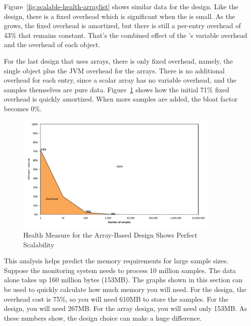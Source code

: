 Figure~\ref{fig:scalable-health-arraylist} shows similar data for the
 design. Like the  design, there is a fixed
overhead which is significant when the  is small. As the
 grows, the fixed overhead is amortized, but there is
still a per-entry overhead of 43\% that remains constant. That's the combined effect of 
the 's variable overhead and the overhead of each 
object.

For the last design that uses arrays, there is only fixed overhead, namely, the
single  object plus the JVM overhead for the arrays. There is no
additional overhead for each entry, since a scalar
array has no variable overhead, and the samples themselves are pure data.
Figure~\ref{fig:scalable-health-array} shows how the initial 71\% fixed overhead is
quickly amortized. When more samples are added, the bloat
factor becomes 0\%.

\begin{figure}
  \centering
  \includegraphics[width=0.9\textwidth]{part1/Figures/memoryhealth/scalable-health-array}
  \caption{Health Measure for the Array-Based Design Shows Perfect Scalability}
  \label{fig:scalable-health-array}
\end{figure}

This analysis helps predict the memory requirements for large sample sizes.
Suppose the monitoring system needs to process 10 million samples. The data
alone takes up 160 million bytes (153MB).  The graphs shown in this section can
be used to quickly calculate how much memory you will need. For the
 design, the overhead cost is 75\%, so you will need 610MB to
store the samples. For the  design, you will need 267MB. For the
array design, you will need only 153MB. As these numbers show, the design
choice can make a huge difference.

